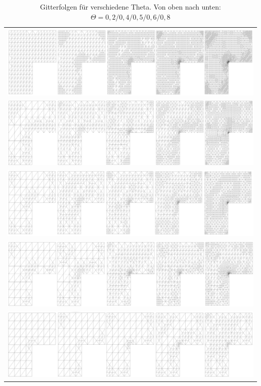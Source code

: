 \begin{table}[!htbp]
	\begin{tabular}{c}
		\includegraphics[width=15.5cm]{pics/grid02.png} \\
		\includegraphics[width=15.5cm]{pics/grid04.png} \\
		\includegraphics[width=15.5cm]{pics/grid05.png} \\
		\includegraphics[width=15.5cm]{pics/grid06.png} \\
		\includegraphics[width=15.5cm]{pics/grid08.png} \\
	\end{tabular}
	\caption{ \label{tabelle} Gitterfolgen für verschiedene Theta. Von oben nach unten: $\Theta = 0,2/0,4/0,5/0,6/0,8$}
\end{table}

